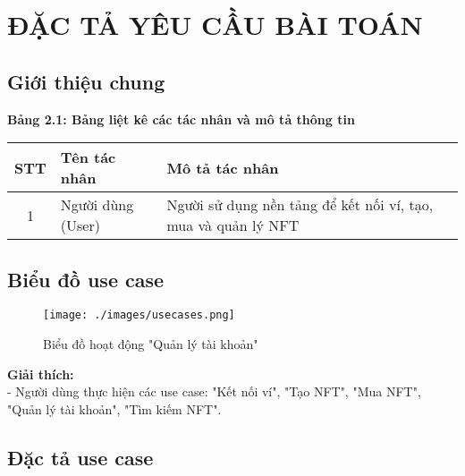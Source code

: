 \chapter{ĐẶC TẢ YÊU CẦU BÀI TOÁN}

\section{Giới thiệu chung}
\textbf{Bảng 2.1: Bảng liệt kê các tác nhân và mô tả thông tin}
\begin{center}
\renewcommand{\arraystretch}{1.5}
\begin{tabular}{|c|l|p{8cm}|}
    \hline
    \rule{0pt}{3ex}\textbf{STT} & \textbf{Tên tác nhân} & \textbf{Mô tả tác nhân} \\
    \hline
    \rule{0pt}{3ex}1 & Người dùng (User) & Người sử dụng nền tảng để kết nối ví, tạo, mua và quản lý NFT \\
    \hline
\end{tabular}
\end{center}

\section{Biểu đồ use case}
\begin{figure}[H]
    \centering
    \texttt{[image: ./images/usecases.png]}
    \caption{Biểu đồ hoạt động "Quản lý tài khoản"}
    \label{fig:usecases}
\end{figure}
\textbf{Giải thích:} \\
- Người dùng thực hiện các use case: "Kết nối ví", "Tạo NFT", "Mua NFT", "Quản lý tài khoản", "Tìm kiếm NFT". \\

\section{Đặc tả use case}

